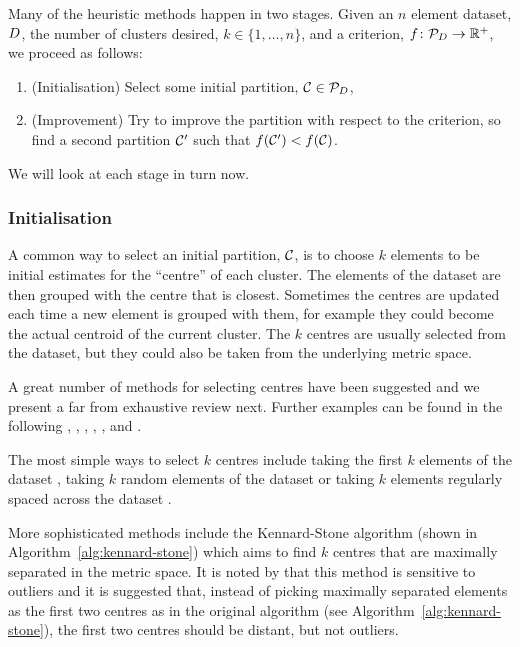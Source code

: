Many of the heuristic methods happen in two stages.  Given an $n$ element
dataset, $D$, the number of clusters desired, $k \in \{1,\dotsc,n\}$, and
a criterion, $f \colon \mathcal{P}_{D} \to \mathbb{R}^+$, we proceed as
follows:
\begin{enumerate}
\item (Initialisation) Select some initial partition, $\mathcal{C}
  \in \mathcal{P}_{D}$,
\item (Improvement) Try to improve the partition with respect to the
  criterion, so find a second partition $\mathcal{C}'$ such that $f(\mathcal{C}') <
  f(\mathcal{C})$.
\end{enumerate}
We will look at each stage in turn now.

\subsubsection{Initialisation}
\label{sec:initialisation}

A common way to select an initial partition, $\mathcal{C}$, is to choose $k$
elements to be initial estimates for the ``centre'' of each cluster.  The
elements of the dataset are then grouped with the centre that is closest.
Sometimes the centres are updated each time a new element is grouped with
them, for example they could become the actual centroid of the current
cluster.  The $k$ centres are usually selected from the dataset, but they
could also be taken from the underlying metric space.

A great number of methods for selecting centres have been suggested and we
present a far from exhaustive review next.  Further examples can be found in
the following \citep{he2004initialization}, \citep{khan2004clusterecenter},
\citep{cao09initialization}, \citep{yedla2010enhancing},
\citep{zhang2009initialcenters}, \citep{Erisoglu2011intiailcenters} and
\citep{redmond2007method}.

The most simple ways to select $k$ centres include taking the first $k$
elements of the dataset \citep{macqueen1967some}, taking $k$ random elements
of the dataset \citep{forgy65cluster} or taking $k$ elements regularly spaced
across the dataset \citep{beale1969euclidean}.

More sophisticated methods include the Kennard-Stone algorithm (shown in
Algorithm~\ref{alg:kennard-stone}) which aims to find $k$ centres that are
maximally separated in the metric space.  It is noted by
\citet{degroot1999selecting} that this method is sensitive to outliers and it
is suggested that, instead of picking maximally separated elements as the
first two centres as in the original algorithm (see
Algorithm~\ref{alg:kennard-stone}), the first two centres should be distant,
but not outliers.

